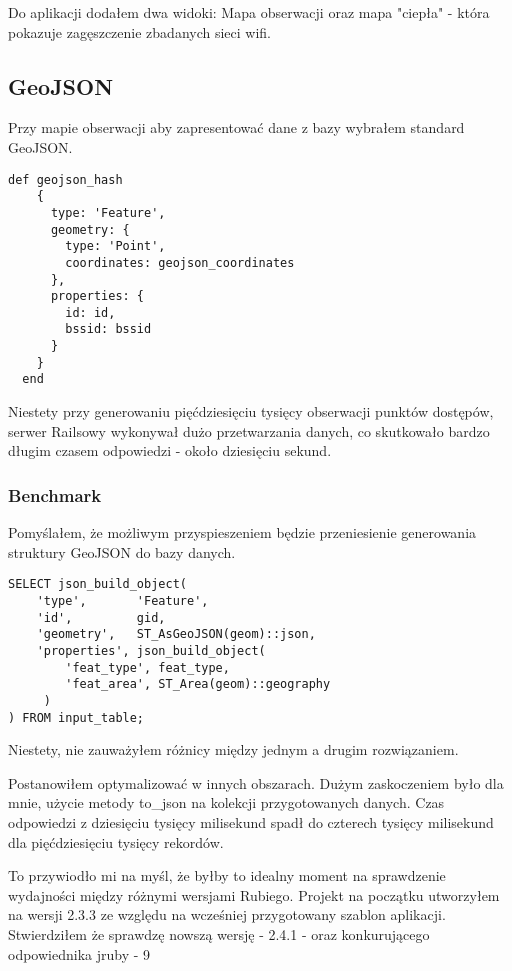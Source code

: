 Do aplikacji dodałem dwa widoki: Mapa obserwacji oraz mapa "ciepła" - która pokazuje zagęszczenie zbadanych sieci wifi.

\subsection{GeoJSON}
Przy mapie obserwacji aby zapresentować dane z bazy wybrałem standard GeoJSON. 

\begin{lstlisting}[caption=Ruby geojson\_hash]
  def geojson_hash
    {
      type: 'Feature',
      geometry: {
        type: 'Point',
        coordinates: geojson_coordinates
      },
      properties: {
        id: id,
        bssid: bssid
      }
    }
  end
\end{lstlisting}

Niestety przy generowaniu pięćdziesięciu tysięcy obserwacji punktów dostępów, serwer Railsowy wykonywał dużo przetwarzania danych, co skutkowało bardzo długim czasem odpowiedzi - około dziesięciu sekund.

\subsubsection{Benchmark}

Pomyślałem, że możliwym przyspieszeniem będzie przeniesienie generowania struktury GeoJSON do bazy danych.

\begin{lstlisting}[caption=Ruby geojson\_hash]
SELECT json_build_object(
    'type',       'Feature',
    'id',         gid,
    'geometry',   ST_AsGeoJSON(geom)::json,
    'properties', json_build_object(
        'feat_type', feat_type,
        'feat_area', ST_Area(geom)::geography
     )
) FROM input_table;
\end{lstlisting}

Niestety, nie zauważyłem różnicy między jednym a drugim rozwiązaniem.


Postanowiłem optymalizować w innych obszarach. Dużym zaskoczeniem było dla mnie, użycie metody to_json na kolekcji przygotowanych danych. Czas odpowiedzi z dziesięciu tysięcy milisekund spadł do czterech tysięcy milisekund dla pięćdziesięciu tysięcy rekordów.


To przywiodło mi na myśl, że byłby to idealny moment na sprawdzenie wydajności między różnymi wersjami Rubiego. Projekt na początku utworzyłem na wersji 2.3.3 ze względu na wcześniej przygotowany szablon aplikacji. Stwierdziłem że sprawdzę nowszą wersję - 2.4.1 - oraz konkurującego odpowiednika jruby - 9

